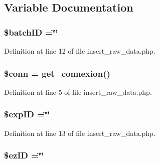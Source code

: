 \subsection{Variable Documentation}
\hypertarget{insert__raw__data_8php_aaa6d122ea9cb55b210aadd86e5654a74}{
\subsubsection[{\$batch\-I\-D}]{\setlength{\rightskip}{0pt plus 5cm}\${\bf batch\-I\-D} =\char`\"{}\char`\"{}}}\label{insert__raw__data_8php_aaa6d122ea9cb55b210aadd86e5654a74}


Definition at line 12 of file insert\-\_\-raw\-\_\-data.\-php.

\hypertarget{insert__raw__data_8php_aa8a5a87b9c1a6a0819b88447cbe41877}{
\subsubsection[{\$conn}]{\setlength{\rightskip}{0pt plus 5cm}\$conn = {\bf get\-\_\-connexion}()}}\label{insert__raw__data_8php_aa8a5a87b9c1a6a0819b88447cbe41877}


Definition at line 5 of file insert\-\_\-raw\-\_\-data.\-php.

\hypertarget{insert__raw__data_8php_ae384d32e62e85e587cd27bf249ed3db3}{
\subsubsection[{\$exp\-I\-D}]{\setlength{\rightskip}{0pt plus 5cm}\${\bf exp\-I\-D} =\char`\"{}\char`\"{}}}\label{insert__raw__data_8php_ae384d32e62e85e587cd27bf249ed3db3}


Definition at line 13 of file insert\-\_\-raw\-\_\-data.\-php.

\hypertarget{insert__raw__data_8php_addb1ec3ba55e413a08cb006ce21974df}{
\subsubsection[{\$ez\-I\-D}]{\setlength{\rightskip}{0pt plus 5cm}\${\bf ez\-I\-D} =\char`\"{}\char`\"{}}}\label{insert__raw__data_8php_addb1ec3ba55e413a08cb006ce21974df}


